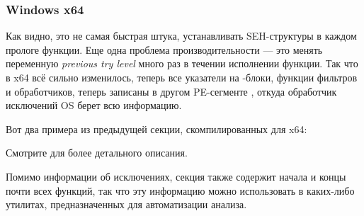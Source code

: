 \subsubsection{Windows x64}

\label{SEH_win64}
Как видно, это не самая быстрая штука, устанавливать SEH-структуры в каждом прологе функции.
Еще одна проблема производительности --- это менять переменную 
\emph{previous try level} много раз в течении исполнении функции.
Так что в x64 всё сильно изменилось, теперь все указатели на -блоки, функции фильтров и обработчиков,
теперь записаны в другом PE-сегменте
 , откуда обработчик исключений \ac{OS} берет всю информацию.

Вот два примера из предыдущей секции, скомпилированных для x64:





Смотрите \IgorSkochinsky для более детального описания.

Помимо информации об исключениях, секция  
также содержит начала и концы почти всех функций, так что эту информацию можно использовать в каких-либо
утилитах, предназначенных для автоматизации анализа.

